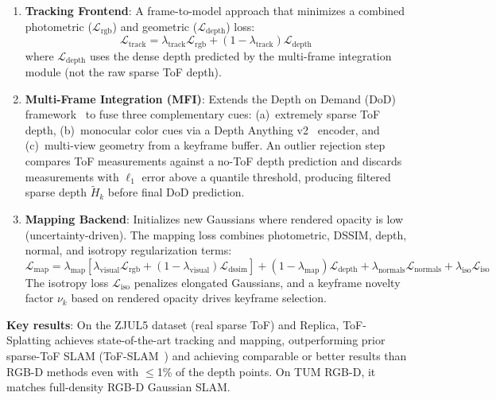 \begin{enumerate}
    \item \textbf{Tracking Frontend}: A frame-to-model approach that
    minimizes a combined photometric ($\mathcal{L}_{\text{rgb}}$) and
    geometric ($\mathcal{L}_{\text{depth}}$) loss:
    \begin{equation}
        \mathcal{L}_{\text{track}} = \lambda_{\text{track}}
        \mathcal{L}_{\text{rgb}} + (1-\lambda_{\text{track}})
        \mathcal{L}_{\text{depth}}
    \end{equation}
    where $\mathcal{L}_{\text{depth}}$ uses the dense depth predicted by the
    multi-frame integration module (not the raw sparse ToF depth).

    \item \textbf{Multi-Frame Integration (MFI)}: Extends the Depth on Demand
    (DoD) framework~\cite{conti2024_dod} to fuse three complementary cues:
    (a)~extremely sparse ToF depth, (b)~monocular color cues via a Depth
    Anything v2~\cite{yang2024depthanythingv2} encoder, and
    (c)~multi-view geometry from a keyframe buffer.  An outlier rejection
    step compares ToF measurements against a no-ToF depth prediction and
    discards measurements with $\ell_1$ error above a quantile threshold,
    producing filtered sparse depth $\tilde{H}_k$ before final DoD
    prediction.

    \item \textbf{Mapping Backend}: Initializes new Gaussians where rendered
    opacity is low (uncertainty-driven).  The mapping loss combines
    photometric, DSSIM, depth, normal, and isotropy regularization terms:
    \begin{equation}
        \mathcal{L}_{\text{map}} = \lambda_{\text{map}}[\lambda_{\text{visual}}
        \mathcal{L}_{\text{rgb}} + (1-\lambda_{\text{visual}})
        \mathcal{L}_{\text{dssim}}] + (1-\lambda_{\text{map}})
        \mathcal{L}_{\text{depth}} + \lambda_{\text{normals}}
        \mathcal{L}_{\text{normals}} + \lambda_{\text{iso}}
        \mathcal{L}_{\text{iso}}
    \end{equation}
    The isotropy loss $\mathcal{L}_{\text{iso}}$ penalizes elongated
    Gaussians, and a keyframe novelty factor $\nu_k$ based on rendered
    opacity drives keyframe selection.
\end{enumerate}

\textbf{Key results}: On the ZJUL5 dataset (real sparse ToF) and Replica,
ToF-Splatting achieves state-of-the-art tracking and mapping, outperforming
prior sparse-ToF SLAM (ToF-SLAM~\cite{jiang2022quantizedtof}) and achieving
comparable or better results than RGB-D methods even with $\leq$1\% of the
depth points.  On TUM RGB-D, it matches full-density RGB-D Gaussian SLAM.

